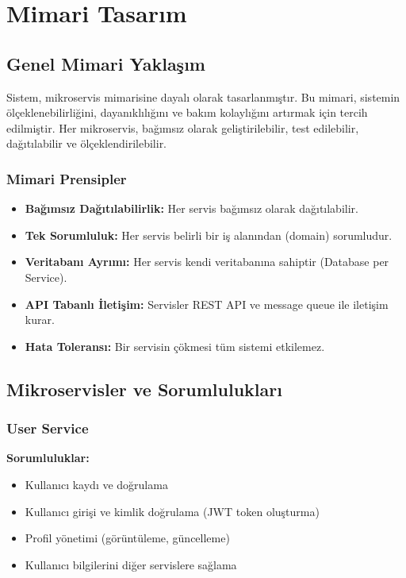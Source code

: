 \chapter{Mimari Tasarım}

\section{Genel Mimari Yaklaşım}
Sistem, mikroservis mimarisine dayalı olarak tasarlanmıştır. Bu mimari, sistemin ölçeklenebilirliğini, dayanıklılığını ve bakım kolaylığını artırmak için tercih edilmiştir. Her mikroservis, bağımsız olarak geliştirilebilir, test edilebilir, dağıtılabilir ve ölçeklendirilebilir.

\subsection{Mimari Prensipler}
\begin{itemize}
    \item \textbf{Bağımsız Dağıtılabilirlik:} Her servis bağımsız olarak dağıtılabilir.
    \item \textbf{Tek Sorumluluk:} Her servis belirli bir iş alanından (domain) sorumludur.
    \item \textbf{Veritabanı Ayrımı:} Her servis kendi veritabanına sahiptir (Database per Service).
    \item \textbf{API Tabanlı İletişim:} Servisler REST API ve message queue ile iletişim kurar.
    \item \textbf{Hata Toleransı:} Bir servisin çökmesi tüm sistemi etkilemez.
\end{itemize}

\section{Mikroservisler ve Sorumlulukları}

\subsection{User Service}
\textbf{Sorumluluklar:}
\begin{itemize}
    \item Kullanıcı kaydı ve doğrulama
    \item Kullanıcı girişi ve kimlik doğrulama (JWT token oluşturma)
    \item Profil yönetimi (görüntüleme, güncelleme)
    \item Kullanıcı bilgilerini diğer servislere sağlama
\end{itemize}

